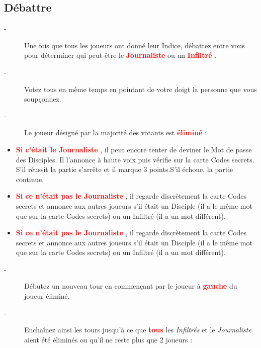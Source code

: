 \documentclass{article}%
\begin{document}
\subsection{ Débattre
}%
\label{subsec:Dbattre}%
\begin{description}%
\item[{-} ]%
%
 Une fois que tous les joueurs ont donné leur Indice, débattez entre vous pour déterminer qui peut être le %
\textcolor{red}{%
\textbf{Journaliste}%
}%
\textit{ }%
 ou un %
\textcolor{red}{%
\textbf{Infiltré}%
}%
.
%
\item[{-} ]%
%
 Votez tous en même temps en pointant de votre doigt la personne que vous soupçonnez.
%
\item[{-} ]%
%
 Le joueur désigné par la majorité des votants est %
\textcolor{red}{%
\textbf{éliminé}%
}%
\textit{ }%
 :
%
\end{description}%
\begin{itemize}%
\item%
%
\textcolor{red}{%
\textbf{Si c’était le Journaliste}%
}%
, il peut encore tenter de deviner le Mot de passe des Disciples. Il l'annonce à haute voix puis vérifie sur la carte Codes secrets. S’il réussit la partie s’arrête et il marque 3 points.S’il échoue, la partie continue.
%
\item%
%
\textcolor{red}{%
\textbf{Si ce n’était pas le Journaliste}%
}%
, il regarde discrètement la carte Codes secrets et annonce aux autres joueurs s’il était un Disciple (il a le même mot que sur la carte Codes secrets) ou un Infiltré (il a un mot différent).
%
\end{itemize}%
\begin{itemize}%
\item%
%
\textcolor{red}{%
\textbf{Si ce n’était pas le Journaliste}%
}%
, il regarde discrètement la carte Codes secrets et annonce aux autres joueurs s’il était un Disciple (il a le même mot que sur la carte Codes secrets) ou un Infiltré (il a un mot différent).
%
\end{itemize}%
\begin{description}%
\item[{-} ]%
%
 Débutez un nouveau tour en commençant par le joueur à %
\textcolor{red}{%
\textbf{gauche}%
}%
\textit{ }%
 du joueur éliminé.
%
\item[{-} ]%
%
 Enchaînez ainsi les tours jusqu’à ce que %
\textcolor{red}{%
\textbf{tous}%
}%
\textit{ }%
 les %
\textit{Infiltrés}%
\textit{ }%
 et le %
\textit{Journaliste}%
\textit{ }%
 aient été éliminés ou qu’il ne reste plus que 2 joueurs :
%
\end{description}%
\end{document}
